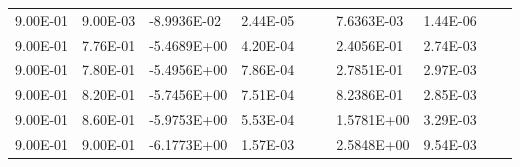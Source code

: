 \documentclass[10pt, twocolumn]{revtex4}    %
\begin{document}
\begin{table}[]
{\begin{tabular}{@{}llllllllll@{}}
			9.00E-01 & 9.00E-03   & -8.9936E-02       & 2.44E-05 &      &       & 7.6363E-03        & 1.44E-06 &       &       \\
			9.00E-01 & 7.76E-01   & -5.4689E+00       & 4.20E-04 &      &       & 2.4056E-01        & 2.74E-03 &       &       \\
			9.00E-01 & 7.80E-01   & -5.4956E+00       & 7.86E-04 &      &       & 2.7851E-01        & 2.97E-03 &       &       \\
			9.00E-01 & 8.20E-01   & -5.7456E+00       & 7.51E-04 &      &       & 8.2386E-01        & 2.85E-03 &       &       \\
			9.00E-01 & 8.60E-01   & -5.9753E+00       & 5.53E-04 &      &       & 1.5781E+00        & 3.29E-03 &       &       \\
			9.00E-01 & 9.00E-01   & -6.1773E+00       & 1.57E-03 &      &       & 2.5848E+00        & 9.54E-03 &       &       \\ \bottomrule
		\end{tabular}%
	}
\end{table}
\end{document}
